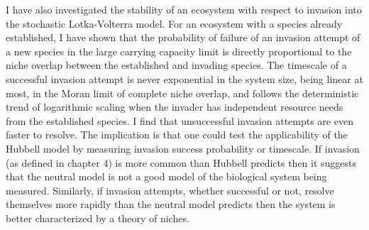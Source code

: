 I have also investigated the stability of an ecosystem with respect to invasion into the stochastic Lotka-Volterra model. 
For an ecosystem with a species already established, I have shown that the probability of failure of an invasion attempt of a new species in the large carrying capacity limit is directly proportional to the niche overlap between the established and invading species. 
The timescale of a successful invasion attempt is never exponential in the system size, being linear at most, in the Moran limit of complete niche overlap, and follows the deterministic trend of logarithmic scaling when the invader has independent resource needs from the established species. 
I find that unsuccessful invasion attempts are even faster to resolve. 
The implication is that one could test the applicability of the Hubbell model by measuring invasion success probability or timescale. 
If invasion (as defined in chapter 4) is more common than Hubbell predicts then it suggests that the neutral model is not a good model of the biological system being measured. 
Similarly, if invasion attempts, whether successful or not, resolve themselves more rapidly than the neutral model predicts then the system is better characterized by a theory of niches. 

